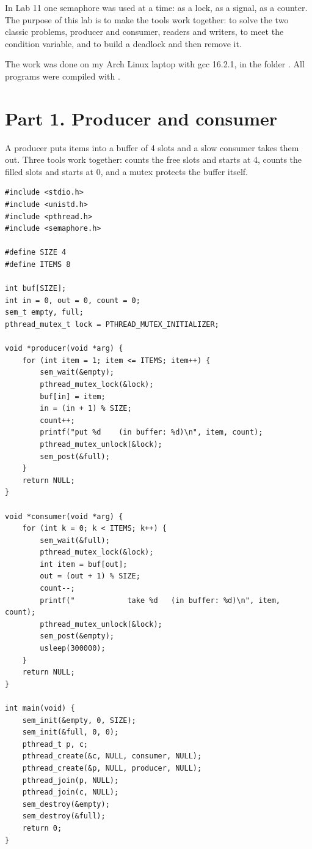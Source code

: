 \documentclass[11pt,a4paper]{article}
\begin{document}
\utmtitlepage
\tableofcontents
\newpage


In Lab 11 one semaphore was used at a time: as a lock, as a signal, as a counter. The purpose of
this lab is to make the tools work together: to solve the two classic problems, producer and
consumer, readers and writers, to meet the condition variable, and to build a deadlock and then
remove it.

The work was done on my Arch Linux laptop with gcc 16.2.1, in the folder
. All programs were compiled with .

\section{Part 1. Producer and consumer}

A producer puts items into a buffer of 4 slots and a slow consumer takes them out. Three tools
work together:  counts the free slots and starts at 4,  counts the filled
slots and starts at 0, and a mutex protects the buffer itself.

\begin{lstlisting}[style=ccode,caption={prodcons.c}]
#include <stdio.h>
#include <unistd.h>
#include <pthread.h>
#include <semaphore.h>

#define SIZE 4
#define ITEMS 8

int buf[SIZE];
int in = 0, out = 0, count = 0;
sem_t empty, full;
pthread_mutex_t lock = PTHREAD_MUTEX_INITIALIZER;

void *producer(void *arg) {
    for (int item = 1; item <= ITEMS; item++) {
        sem_wait(&empty);
        pthread_mutex_lock(&lock);
        buf[in] = item;
        in = (in + 1) % SIZE;
        count++;
        printf("put %d    (in buffer: %d)\n", item, count);
        pthread_mutex_unlock(&lock);
        sem_post(&full);
    }
    return NULL;
}

void *consumer(void *arg) {
    for (int k = 0; k < ITEMS; k++) {
        sem_wait(&full);
        pthread_mutex_lock(&lock);
        int item = buf[out];
        out = (out + 1) % SIZE;
        count--;
        printf("            take %d   (in buffer: %d)\n", item, count);
        pthread_mutex_unlock(&lock);
        sem_post(&empty);
        usleep(300000);
    }
    return NULL;
}

int main(void) {
    sem_init(&empty, 0, SIZE);
    sem_init(&full, 0, 0);
    pthread_t p, c;
    pthread_create(&c, NULL, consumer, NULL);
    pthread_create(&p, NULL, producer, NULL);
    pthread_join(p, NULL);
    pthread_join(c, NULL);
    sem_destroy(&empty);
    sem_destroy(&full);
    return 0;
}
\end{lstlisting}
\end{document}

